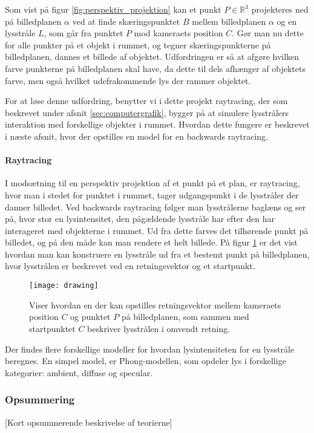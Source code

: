 Som vist på figur \ref{fig:perspektiv_projektion} kan et punkt $P\in \mathbb{R}^3$ projekteres ned på billedplanen $\alpha$ ved at finde skæringspunktet $B$ mellem billedplanen $\alpha$ og en lysstråle $L$, som går fra punktet $P$ mod kameraets position $C$. Gør man nu dette for alle punkter på et objekt i rummet, og tegner skæringspunkterne på billedplanen, dannes et billede af objektet. Udfordringen er så at afgøre hvilken farve punkterne på billedplanen skal have, da dette til dels afhænger af objektets farve, men også hvilket udefrakommende lys der rammer objektet. 

For at løse denne udfordring, benytter vi i dette projekt raytracing, der som beskrevet under afsnit \ref{sec:computergrafik}, bygger på at simulere lysstrålers interaktion med forskellige objekter i rummet. Hvordan dette fungere er beskrevet i næste afsnit, hvor der opstilles en model for en backwards raytracing.

\paragraph{Raytracing}
I modsætning til en perspektiv projektion af et punkt på et plan, er raytracing, hvor man i stedet for punktet i rummet, tager udgangspunkt i de lysstråler der danner billedet. Ved backwards raytracing følger man lysstrålerne baglæns og ser på, hvor stor en lysintensitet, den pågældende lysstråle har efter den har interageret med objekterne i rummet. Ud fra dette farves det tilhørende punkt på billedet, og på den måde kan man rendere et helt billede. På figur \ref{fig:raytracing_skitse} er det vist hvordan man kan konstruere en lysstråle ud fra et bestemt punkt på billedplanen, hvor lysstrålen er beskrevet ved en retningsvektor og et startpunkt.

\begin{figure}[H]
  \label{fig:raytracing_skitse}
  \centering
  \texttt{[image: drawing]}
  \caption{Viser hvordan en der kan opstilles retningsvektor mellem kameraets position $C$ og punktet $P$ på billedplanen, som sammen med startpunktet $C$ beskriver lysstrålen i omvendt retning.}
\end{figure}

Der findes flere forskellige modeller for hvordan lysintensiteten for en lysstråle beregnes. En simpel model, er Phong-modellen, som opdeler lys i forskellige kategorier: ambient, diffuse og specular.


\subsubsection*{Opsummering}

[Kort opsummerende beskrivelse af teorierne]